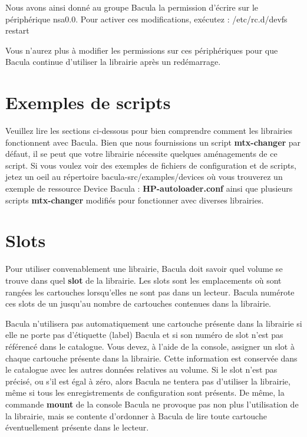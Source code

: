 Nous avons ainsi donn\'e au groupe Bacula la permission d'\'ecrire 
sur le p\'eriph\'erique nsa0.0. Pour activer ces modifications, ex\'ecutez : 
/etc/rc.d/devfs restart

Vous n'aurez plus \`a modifier les permissions sur ces p\'eriph\'eriques 
pour que Bacula continue d'utiliser la librairie apr\`es un red\'emarrage.

\label{scripts}

\section{Exemples de scripts}

Veuillez lire les sections ci-dessous pour bien comprendre comment 
les librairies fonctionnent avec Bacula. Bien que nous fournissions 
un script {\bf mtx-changer} par d\'efaut, il se peut que votre librairie 
n\'ecessite quelques am\'enagements de ce script. Si vous voulez voir des 
exemples de fichiers de configuration et de scripts, jetez un oeil 
au r\'epertoire \lt{}bacula-src\gt{}/examples/devices o\`u vous 
trouverez un exemple de ressource Device Bacula : {\bf HP-autoloader.conf} 
ainsi que plusieurs scripts {\bf mtx-changer} modifi\'es pour fonctionner 
avec diverses librairies.

\label{Slots}

\section*{Slots}

Pour utiliser convenablement une librairie, Bacula doit savoir quel volume 
se trouve dans quel {\bf slot} de la librairie. Les slots sont les 
emplacements o\`u sont rang\'ees les cartouches lorsqu'elles ne sont pas dans un 
lecteur. Bacula num\'erote ces slots de un jusqu'au nombre de cartouches 
contenues dans la librairie.

Bacula n'utilisera pas automatiquement une cartouche pr\'esente dans la librairie 
si elle ne porte pas d'\'etiquette (label) Bacula et si son num\'ero de slot n'est pas 
r\'ef\'erenc\'e dans le catalogue. Vous devez, \`a l'aide de la console, assigner un 
slot \`a chaque cartouche pr\'esente dans la librairie. Cette information est 
conserv\'ee dans le catalogue avec les autres donn\'ees relatives au volume. 
Si le slot n'est pas pr\'ecis\'e, ou s'il est \'egal \`a z\'ero, alors Bacula ne tentera 
pas d'utiliser la librairie, m\^eme si tous les enregistrements de configuration 
sont pr\'esents. De m\^eme, la commande {\bf mount} de la console Bacula ne 
provoque pas non plus l'utilisation de la librairie, mais se contente d'ordonner 
\`a Bacula de lire toute cartouche \'eventuellement pr\'esente dans le lecteur.

